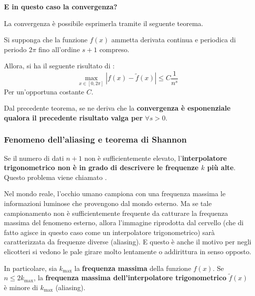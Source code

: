 \begin{flushleft}
	\textcolor{Green3}{ \textbf{E in questo caso la convergenza?}}
\end{flushleft}
La convergenza è possibile esprimerla tramite il seguente teorema.
\begin{theorem}
	Si supponga che la funzione $f\left(x\right)$ ammetta derivata continua e periodica di periodo $2\pi$ fino all'ordine $s+1$ compreso.
	
	Allora, si ha il seguente risultato di :
	\begin{equation}
		\underset{x \in \left[0, 2\pi\right]}{\max} \left|f\left(x\right) - \tilde{f}\left(x\right)\right| \le C\dfrac{1}{n^{s}}
	\end{equation}
	Per un'opportuna costante $C$.
\end{theorem}

\noindent
Dal precedente teorema, se ne deriva che la \textbf{convergenza è esponenziale qualora il precedente risultato valga per} $\forall s > 0$.

\newpage

\subsubsection{Fenomeno dell'aliasing e teorema di Shannon}

Se il numero di dati $n+1$ non è sufficientemente elevato, l'\textbf{interpolatore trigonometrico non è in grado di descrivere le frequenze $k$ più alte}. Questo problema viene chiamato .

\highspace
Nel mondo reale, l'occhio umano campiona con una frequenza massima le informazioni luminose che provengono dal mondo esterno. Ma se tale campionamento non è sufficientemente frequente da catturare la frequenza massima del fenomeno esterno, allora l'immagine riprodotta dal cervello (che di fatto agisce in questo caso come un interpolatore trigonometrico) sarà caratterizzata da frequenze diverse (aliasing). E questo è anche il motivo per negli elicotteri si vedono le pale girare molto lentamente o addirittura in senso opposto.

\highspace
In particolare, sia $k_{\max}$ la \textbf{frequenza massima} della funzione $f\left(x\right)$. Se $n \le 2k_{\max}$, la \textbf{frequenza massima dell'interpolatore trigonometrico} $\tilde{f}\left(x\right)$ è minore di $k_{\max}$ (aliasing).

